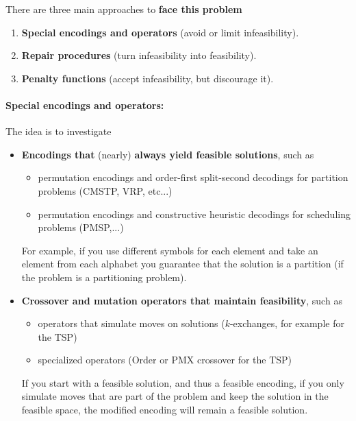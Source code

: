 There are three main approaches to \textbf{face this problem}
\begin{enumerate}
	\item \textbf{Special encodings and operators} (avoid or limit infeasibility).\\
	
	\item \textbf{Repair procedures} (turn infeasibility into feasibility).\\
	
	\item \textbf{Penalty functions} (accept infeasibility, but discourage it).\\
\end{enumerate}

\newpage

\paragraph{Special encodings and operators:} The idea is to investigate
\begin{itemize}
	\item \textbf{Encodings that} (nearly) \textbf{always yield feasible solutions}, such as
	\begin{itemize}
		\item permutation encodings and order-first split-second decodings for partition problems (CMSTP, VRP, etc...)
		\item permutation encodings and constructive heuristic decodings for scheduling problems (PMSP,...)
	\end{itemize}
	For example, if you use different symbols for each element and take an element from each alphabet you guarantee that the solution is a partition (if the problem is a partitioning problem).\\
	
	\item \textbf{Crossover and mutation operators that maintain feasibility}, such as
	\begin{itemize}
		\item operators that simulate moves on solutions ($k$-exchanges, for example for the TSP)
		\item specialized operators (Order or PMX crossover for the TSP)
	\end{itemize}
	If you start with a feasible solution, and thus a feasible encoding, if you only simulate moves that are part of the problem and keep the solution in the feasible space, the modified encoding will remain a feasible solution.\\
\end{itemize}

